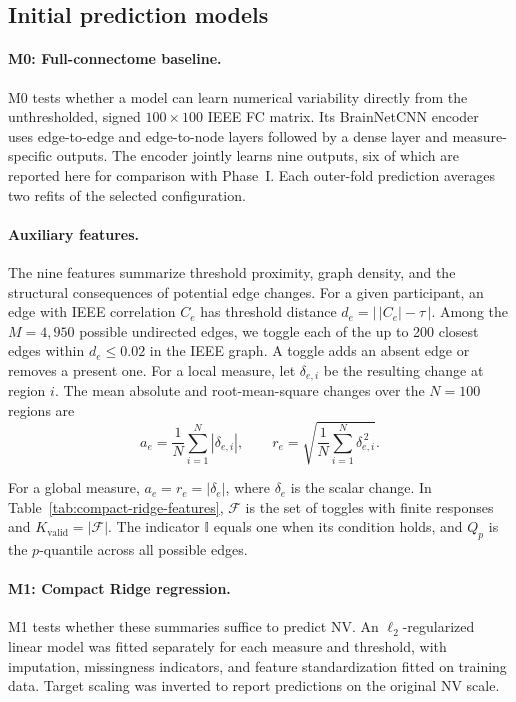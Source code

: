\subsection{Initial prediction models}

\paragraph{M0: Full-connectome baseline.}
M0 tests whether a model can learn numerical variability directly from the unthresholded, signed $100 \times 100$ IEEE FC matrix. Its BrainNetCNN encoder~\cite{Kawahara2017BrainNetCNN} uses edge-to-edge and edge-to-node layers followed by a dense layer and measure-specific outputs. The encoder jointly learns nine outputs, six of which are reported here for comparison with Phase~I. Each outer-fold prediction averages two refits of the selected configuration.

\paragraph{Auxiliary features.}
The nine features summarize threshold proximity, graph density, and the structural consequences of potential edge changes. For a given participant, an edge with IEEE correlation $C_e$ has threshold distance $d_e=\left|\,|C_e|-\tau\,\right|$. Among the $M=4{,}950$ possible undirected edges, we toggle each of the up to 200 closest edges within $d_e\leq 0.02$ in the IEEE graph. A toggle adds an absent edge or removes a present one. For a local measure, let $\delta_{e,i}$ be the resulting change at region $i$. The mean absolute and root-mean-square changes over the $N=100$ regions are
\begin{equation}
    a_e = \frac{1}{N}\sum_{i=1}^{N}|\delta_{e,i}|,
    \qquad
    r_e = \sqrt{\frac{1}{N}\sum_{i=1}^{N}\delta_{e,i}^{\,2}}.
\end{equation}

For a global measure, $a_e=r_e=|\delta_e|$, where $\delta_e$ is the scalar change. In Table~\ref{tab:compact-ridge-features}, $\mathcal F$ is the set of toggles with finite responses and $K_{\mathrm{valid}}=|\mathcal F|$. The indicator $\mathbb I$ equals one when its condition holds, and $Q_p$ is the $p$-quantile across all possible edges.

\paragraph{M1: Compact Ridge regression.}
M1 tests whether these summaries suffice to predict NV. An $\ell_2$-regularized linear model was fitted separately for each measure and threshold, with imputation, missingness indicators, and feature standardization fitted on training data. Target scaling was inverted to report predictions on the original NV scale.

